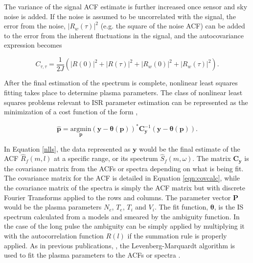 The variance of the signal ACF estimate is further increased once sensor and sky noise is added.  If the noise is assumed to be uncorrelated with the signal, the error from the noise, $\left|R_w (\tau)\right|^2$ (e.g. the square of the noise ACF) can be added to the error from the inherent fluctuations in the signal, and the autocovariance expression becomes

\begin{equation}
\label{eqn:covdiagwn}
C_{\tau,\tau} = \frac{1}{2J} \left(  |R(0)|^2 +|R(\tau)|^2 + \left|R_w (0)\right|^2+\left|R_w (\tau)\right|^2\right).
\end{equation}


After the final estimation of the spectrum is complete, nonlinear least squares fitting takes place to determine plasma parameters.  
The class of nonlinear least squares problems relevant to ISR parameter estimation can be represented as the minimization of a cost function of the form \cite{kayvol1},

\begin{equation}
	\mathbf{\hat{p}}= \underset{\mathbf{p}}{\text{argmin}} (\mathbf{y}-\bm{\theta}(\mathbf{p}))^*\mathbf{C}_{\mathbf{y}}^{-1}(\mathbf{y}-\bm{\theta}(\mathbf{p})).
\label{nlls}
\end{equation}

In Equation \ref{nlls}, the data represented as $\mathbf{y}$ would be the final estimate of the ACF $\widehat{R}_f(m,l)$ at a specific range, or its spectrum $\widehat{S}_f(m,\omega)$. The matrix $\mathbf{C}_{\mathbf{y}}$  is the covariance matrix from the ACFs or spectra depending on what is being fit. The covariance matrix for the ACF is detailed in Equation \ref{eqn:covcalc}, while the covariance matrix of the spectra is simply the ACF matrix but with discrete Fourier Transforms applied to the rows and columns. The parameter vector $\mathbf{P}$ would be the plasma parameters $N_e$, $T_e$, $T_i$ and $V_i$. The fit function, $\bm{\theta}$, is the IS spectrum calculated from a models \cite{kudeki:milla:1} and smeared by the ambiguity function. In the case of the long pulse the ambiguity can be simply applied by multiplying it with the autocorrelation function $R(l)$ if the summation rule is properly applied. As in previous publications, \cite{nikoukar2008}, the Levenberg-Marquardt algorithm is used to fit the plasma parameters to the ACFs or spectra \cite{levenberg1944,marquardt:1963}.

